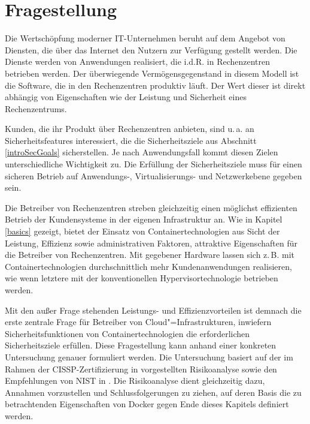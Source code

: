 \documentclass[../main.tex]{subfiles}
\begin{document}
\chapter{Fragestellung}
\label{question}
  Die Wertschöpfung moderner IT-Unternehmen beruht auf dem Angebot von Diensten, die über das Internet den Nutzern zur Verfügung gestellt werden. Die Dienste werden von Anwendungen realisiert, die i.d.R. in Rechenzentren betrieben werden. Der überwiegende Vermögensgegenstand in diesem Modell ist die Software, die in den Rechenzentren produktiv läuft. Der Wert dieser ist direkt abhängig von Eigenschaften wie der Leistung und Sicherheit eines Rechenzentrums.

  Kunden, die ihr Produkt über Rechenzentren anbieten, sind u.\,a. an Sicherheitsfeatures interessiert, die die Sicherheitsziele aus Abschnitt \ref{introSecGoals} sicherstellen. Je nach Anwendungsfall kommt diesen Zielen unterschiedliche Wichtigkeit zu. Die Erfüllung der Sicherheitsziele muss für einen sicheren Betrieb auf Anwendungs-, Virtualisierungs- und Netzwerkebene gegeben sein.

  Die Betreiber von Rechenzentren streben gleichzeitig einen möglichst effizienten Betrieb der Kundensysteme in der eigenen Infrastruktur an. Wie in Kapitel \ref{basics} gezeigt, bietet der Einsatz von Containertechnologien aus Sicht der Leistung, Effizienz sowie administrativen Faktoren, attraktive Eigenschaften für die Betreiber von Rechenzentren. Mit gegebener Hardware lassen sich z.\,B. mit Containertechnologien durchschnittlich mehr Kundenanwendungen realisieren, wie wenn letztere mit der konventionellen Hypervisortechnologie betrieben werden.


  Mit den außer Frage stehenden Leistungs- und Effizienzvorteilen ist demnach die erste zentrale Frage für Betreiber von Cloud"=Infrastrukturen, inwiefern Sicherheitsfunktionen von Containertechnologien die erforderlichen Sicherheitsziele erfüllen. Diese Fragestellung kann anhand einer konkreten Untersuchung genauer formuliert werden. Die Untersuchung basiert auf der im Rahmen der \acrshort{CISSP}-Zertifizierung in \cite[S.36]{CISSP} vorgestellten Risikoanalyse sowie den Empfehlungen von NIST in \cite[S.23]{nist}. Die Risikoanalyse dient gleichzeitig dazu, Annahmen vorzustellen und Schlussfolgerungen zu ziehen, auf deren Basis die zu betrachtenden Eigenschaften von Docker gegen Ende dieses Kapitels definiert werden.
\end{document}
